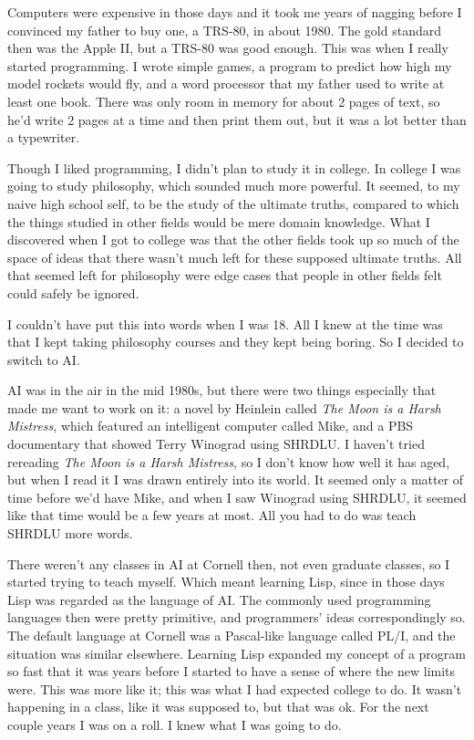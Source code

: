 Computers were expensive in those days and it took me years of nagging
before I convinced my father to buy one, a TRS-80, in about 1980. The
gold standard then was the Apple II, but a TRS-80 was good enough. This
was when I really started programming. I wrote simple games, a program
to predict how high my model rockets would fly, and a word processor
that my father used to write at least one book. There was only room in
memory for about 2 pages of text, so he'd write 2 pages at a time and
then print them out, but it was a lot better than a typewriter.

Though I liked programming, I didn't plan to study it in college. In
college I was going to study philosophy, which sounded much more
powerful. It seemed, to my naive high school self, to be the study of
the ultimate truths, compared to which the things studied in other
fields would be mere domain knowledge. What I discovered when I got to
college was that the other fields took up so much of the space of ideas
that there wasn't much left for these supposed ultimate truths. All that
seemed left for philosophy were edge cases that people in other fields
felt could safely be ignored.

I couldn't have put this into words when I was 18. All I knew at the
time was that I kept taking philosophy courses and they kept being
boring. So I decided to switch to AI.

AI was in the air in the mid 1980s, but there were two things especially
that made me want to work on it: a novel by Heinlein called \emph{The
Moon is a Harsh Mistress}, which featured an intelligent computer called
Mike, and a PBS documentary that showed Terry Winograd using SHRDLU. I
haven't tried rereading \emph{The Moon is a Harsh Mistress}, so I don't
know how well it has aged, but when I read it I was drawn entirely into
its world. It seemed only a matter of time before we'd have Mike, and
when I saw Winograd using SHRDLU, it seemed like that time would be a
few years at most. All you had to do was teach SHRDLU more words.

There weren't any classes in AI at Cornell then, not even graduate
classes, so I started trying to teach myself. Which meant learning Lisp,
since in those days Lisp was regarded as the language of AI. The
commonly used programming languages then were pretty primitive, and
programmers' ideas correspondingly so. The default language at Cornell
was a Pascal-like language called PL/I, and the situation was similar
elsewhere. Learning Lisp expanded my concept of a program so fast that
it was years before I started to have a sense of where the new limits
were. This was more like it; this was what I had expected college to do.
It wasn't happening in a class, like it was supposed to, but that was
ok. For the next couple years I was on a roll. I knew what I was going
to do.

